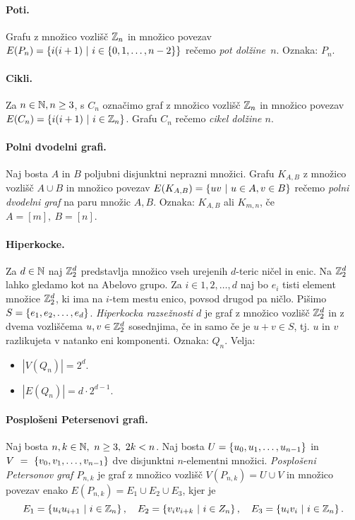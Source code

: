 \paragraph{Poti.} Grafu z množico vozlišč $\mathbb{Z}_n$ in množico povezav $E(P_n) = \left\{i(i+1) \ | \ i \in \left\{0,1, \ldots, n-2\right\}\right\}$ rečemo \emph{pot dolžine~$n$}. Oznaka: $P_n$.

\paragraph{Cikli.} Za $n \in \mathbb{N}, n \geq 3$, s $C_n$ označimo graf z množico vozlišč $\mathbb{Z}_n$ in množico povezav $E(C_n) = \left\{i(i+1) \ | \ i \in \mathbb{Z}_n\right\}$. Grafu $C_n$ rečemo \emph{cikel dolžine $n$}.

\paragraph{Polni dvodelni grafi.} Naj bosta $A$ in $B$ poljubni disjunktni neprazni množici. Grafu $K_{A, B}$ z množico vozlišč $A \cup B$ in množico povezav $E(K_{A,B}) = \left\{uv \ | \ u \in A, v \in B\right\}$ rečemo \emph{polni dvodelni graf} na paru množic $A, B$. Oznaka: $K_{A, B}$ ali $K_{m, n}$, če $A = [m], \ B = [n]$.

\paragraph{Hiperkocke.} Za $d \in \mathbb{N}$ naj $\mathbb{Z}_2^d$ predstavlja množico vseh urejenih $d$-teric ničel in enic. Na $\mathbb{Z}_2^d$ lahko gledamo kot na Abelovo grupo. Za $i \in {1, 2, \ldots, d}$ naj bo $e_i$ tisti element množice $\mathbb{Z}_2^d$, ki ima na $i$-tem mestu enico, povsod drugod pa ničlo. Pišimo $S = \left\{e_1, e_2, \ldots, e_d\right\}$. \emph{Hiperkocka razsežnosti $d$} je graf z množico vozlišč $\mathbb{Z}_2^d$ in z dvema vozliščema $u, v \in \mathbb{Z}_2^d$ sosednjima, če in samo če je $u+ v \in S$, tj. $u$ in $v$ razlikujeta v natanko eni komponenti. Oznaka: $Q_n$. Velja:
\begin{itemize}
    \item $|V(Q_n)| = 2^d$.
    \item $|E(Q_n)| = d \cdot 2 ^{d-1}$.
\end{itemize}

\paragraph{Posplošeni Petersenovi grafi.} Naj bosta $n, k \in \mathbb{N}, \ n \geq 3, \ 2k < n$. Naj bosta $U = \left\{u_0, u_1, \ldots, u_{n-1}\right\}$ in $V~=~\left\{v_0, v_1, \ldots, v_{n-1}\right\}$ dve disjunktni $n$-elementni množici. \emph{Posplošeni Petersonov graf $P_{n,k}$} je graf z množico vozlišč $V(P_{n,k}) = U \cup V$ in množico povezav enako $E(P_{n,k}) = E_1 \cup E_2 \cup E_3$, kjer je 
$$E_1 = \left\{u_iu_{i+1} \ | \ i \in \mathbb{Z}_n\right\}, \quad E_2 = \left\{v_iv_{i+k} \ | \ i \in Z_n\right\}, \quad E_3 = \left\{u_iv_i \ | \ i \in \mathbb{Z}_n\right\}.$$

